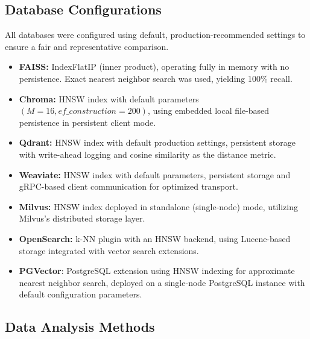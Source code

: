 \documentclass{article}
\begin{document}
\subsection{Database Configurations}
All databases were configured using default, production-recommended settings to ensure a fair and representative comparison.
\begin{itemize}
    \item \textbf{FAISS:} IndexFlatIP (inner product), operating fully in memory with no persistence. Exact nearest neighbor search was used, yielding 100\% recall.    
    \item \textbf{Chroma:} HNSW index with default parameters $(M = 16, ef\_construction = 200)$, using embedded local file-based persistence in persistent client mode.    
    \item  \textbf{Qdrant:} HNSW index with default production settings, persistent storage with write-ahead logging and cosine similarity as the distance metric.  
    \item  \textbf{Weaviate:} HNSW index with default parameters, persistent storage and gRPC-based client communication for optimized transport.    
    \item  \textbf{Milvus:} HNSW index deployed in standalone (single-node) mode, utilizing Milvus's distributed storage layer.    
    \item  \textbf{OpenSearch:} k-NN plugin with an HNSW backend, using Lucene-based storage integrated with vector search extensions.
    \item \textbf{PGVector}: PostgreSQL extension using HNSW indexing for approximate nearest neighbor search, deployed on a single-node PostgreSQL instance with default configuration parameters.
\end{itemize}

\subsection{Data Analysis Methods}
\end{document}
